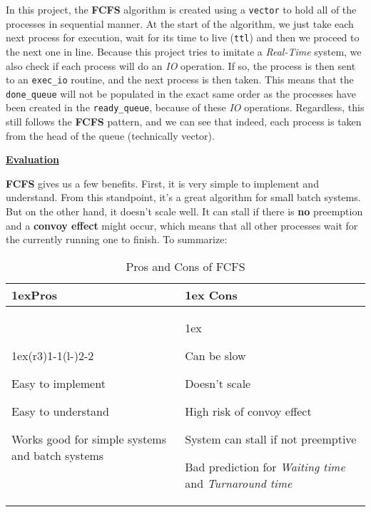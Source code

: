 \documentclass{article}
\newcommand{\code}[1]{\colorbox{codebg}{{\color{black}\texttt{#1}}}}
\begin{document}
In this project, the \textbf{FCFS} algorithm is created using a \code{vector} to hold all of the processes in sequential manner. At the start of the algorithm, we just take each next process for execution, wait for its time to live (\code{ttl}) and then we proceed to the next one in line. Because this project tries to imitate a \textit{Real-Time} system, we also check if each process will do an \textit{IO} operation. If so, the process is then sent to an \code{exec\_io} routine, and the next process is then taken. This means that the \code{done\_queue} will not be populated in the exact same order as the processes have been created in the \code{ready\_queue}, because of these \textit{IO} operations. Regardless, this still follows the \textbf{FCFS} pattern, and we can see that indeed, each process is taken from the head of the queue (technically vector).

\underline{\textbf{Evaluation}}

\textbf{FCFS} gives us a few benefits. First, it is very simple to implement and understand. From this standpoint, it's a great algorithm for small batch systems. But on the other hand, it doesn't scale well. It can stall if there is \textbf{no} preemption and a \textbf{convoy effect} might occur, which means that all other processes wait for the currently running one to finish. To summarize:

\begin{table}[h!]
  \begin{tabularx}{\linewidth}{>{\parskip1ex}X@{\kern4\tabcolsep}>{\parskip1ex}X}
    \toprule
    \hfil\bfseries Pros & \hfil\bfseries Cons \\
    \cmidrule(r{3\tabcolsep}){1-1}\cmidrule(l{-\tabcolsep}){2-2}

    Easy to implement\par
    Easy to understand\par
    Works good for simple systems and batch systems\par

    &

    Can be slow\par
    Doesn't scale\par
    High risk of convoy effect\par
    System can stall if not preemptive\par
    Bad prediction for \textit{Waiting time} and \textit{Turnaround time} \\
    \bottomrule
  \end{tabularx}
  \caption{Pros and Cons of FCFS}
\end{table}
\end{document}
